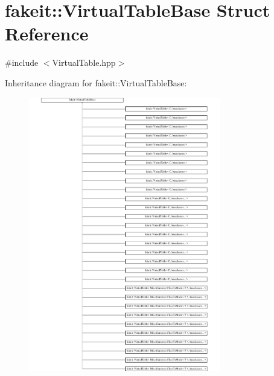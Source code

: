 \hypertarget{structfakeit_1_1VirtualTableBase}{}\section{fakeit\+::Virtual\+Table\+Base Struct Reference}
\label{structfakeit_1_1VirtualTableBase}


{\ttfamily \#include $<$Virtual\+Table.\+hpp$>$}

Inheritance diagram for fakeit\+::Virtual\+Table\+Base\+:\begin{figure}[H]
\begin{center}
\leavevmode
\includegraphics[height=12.000000cm]{structfakeit_1_1VirtualTableBase}
\end{center}
\end{figure}

